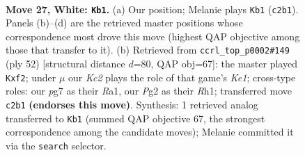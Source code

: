 \documentclass[11pt]{article}
\begin{document}
\clearpage

\begin{figure}[p]\centering
\begin{subfigure}{0.46\textwidth}\centering
\resizebox{\linewidth}{!}{%
\newchessgame
\chessboard[
  setfen={r1b2k2/pp3pp1/n3p3/3p4/8/PP6/2Kr1qPP/R5NR w - - 0 27},
  showmover=false,
  pgfstyle=straightmove, color=movearrow, markmove={c2-b1}
]}
\caption{}
\end{subfigure}\hfill
\begin{subfigure}{0.46\textwidth}\centering
\resizebox{\linewidth}{!}{%
\newchessgame
\chessboard[
  setfen={5rk1/p1p2pp1/1p2p3/8/2r4p/P4B2/1P3qPP/R3K2R w KQ - 0 27},
  showmover=false,
  pgfstyle=straightmove, color=movearrow, markmove={e1-f2}
]}
\caption{}
\end{subfigure}
\\[4pt]

\caption{\textbf{Move 27, White: \texttt{Kb1}.} (a) Our position; Melanie plays \texttt{Kb1} (\texttt{c2b1}). Panels (b)--(d) are the retrieved master positions whose correspondence most drove this move (highest QAP objective among those that transfer to it). (b) Retrieved from \texttt{ccrl\_top\_p0002\#149} (ply 52) [structural distance $d$=80, QAP obj=67]: the master played \texttt{Kxf2}; under $\mu$ our \emph{Kc2} plays the role of that game's \emph{Ke1}; cross-type roles: our \emph{p}g7 as their \emph{R}a1, our \emph{P}g2 as their \emph{R}h1; transferred move \texttt{c2b1} \textbf{(endorses this move)}. Synthesis: 1 retrieved analog transferred to \texttt{Kb1} (summed QAP objective 67, the strongest correspondence among the candidate moves); Melanie committed it via the \texttt{search} selector.}
\label{fig:thought-m52}
\end{figure}
\end{document}
